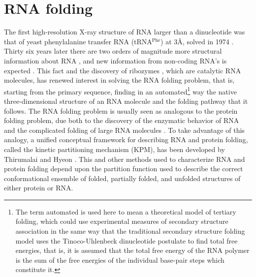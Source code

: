 \section{RNA folding}
The first  high-resolution X-ray structure  of RNA larger
than  a dinucleotide  was  that of  yeast  phenylalanine transfer  RNA
(tRNA$^{\textrm{Phe}}$) at 3{\AA},  solved in 1974 \cite{robertus1974,
  kim1974, stout1976}.  Thirty six years later there are two orders of
magnitude more structural information about RNA \cite{noller2005}, and
new information from non-coding RNA's is expected \cite{weinberg2009}.
This   fact   and  the   discovery   of  ribozymes   \cite{kruger1982,
  takada1983}, which are catalytic RNA molecules, has renewed interest
in  solving  the  RNA  folding  problem,  that  is,
starting    from    the    primary    sequence,    finding    in    an
automated\footnote{The  term   automated  is  used  here   to  mean  a
  theoretical model of tertiary  folding, which could use experimental
  measures of secondary structure association in the same way that the
  traditional  secondary   structure  folding  model  \cite{zuker1989,
    hofacker1994}  uses  the  Tinoco-Uhlenbeck dinucleotide  postulate
  \cite{borer1974} to find total free energies, that is, it is assumed
  that the total free energy of the RNA polymer is the sum of the free
  energies of the individual base-pair steps which constitute it.} way
the  native three-dimensional  structure of  an RNA  molecule  and the
folding pathway  that it follows.  The  RNA folding
problem is usually  seen as analogous to the  protein folding problem,
due  both  to   the  discovery  of  the  enzymatic   behavior  of  RNA
\cite{kruger1982, takada1983} and the complicated folding of large RNA
molecules  \cite{batey1999}.  To  take  advantage of  this analogy,  a
unified conceptual  framework for describing RNA  and protein folding,
called the kinetic partitioning mechanism (KPM), has been developed by
Thirumalai  and Hyeon  \cite{thirumalai2005}. This  and  other methods
used to characterize RNA and protein folding depend upon the partition
function  used  to describe  the  correct  conformational ensemble  of
folded,  partially  folded,  and unfolded  structures  \cite{chen1995,
  chen1998, thirumalai1996} of either protein or RNA.


